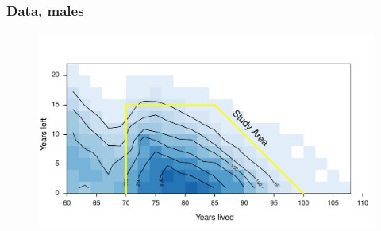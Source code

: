 \documentclass{beamer}
\begin{document}

\begin{frame}
\frametitle{Data, males}
\begin{figure}
\includegraphics[width=\linewidth]{Figures/CaseCountMales}
\end{figure}
\end{frame}

\end{document}
